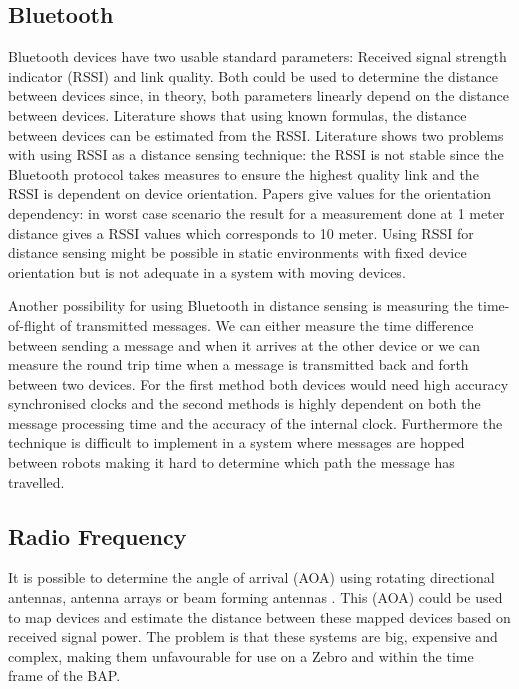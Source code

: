 \subsection*{Bluetooth}

Bluetooth devices have two usable standard parameters: Received signal strength indicator (RSSI) and link quality. Both could be used to determine the distance between devices since, in theory, both parameters linearly depend on the distance between devices. Literature shows that using known formulas, the distance between devices can be estimated from the RSSI. Literature \cite{Forno2005} shows two problems with using RSSI as a distance sensing technique: the RSSI is not stable since the Bluetooth protocol takes measures to ensure the highest quality link and the RSSI is dependent on device orientation. Papers \cite{Scheerens2012,Dahlgren2014} give values for the orientation dependency: in worst case scenario the result for a measurement done at 1 meter distance gives a RSSI values which corresponds to 10 meter. Using RSSI for distance sensing might be possible in static environments with fixed device orientation but is not adequate in a system with moving devices.

Another possibility for using Bluetooth in distance sensing is measuring the time-of-flight of transmitted messages. We can either measure the time difference between sending a message and when it arrives at the other device or we can measure the round trip time when a message is transmitted back and forth between two devices. For the first method both devices would need high accuracy synchronised clocks \cite{Ekberg2009} and the second methods is highly dependent on both the message processing time and the accuracy of the internal clock. Furthermore the technique is difficult to implement in a system where messages are hopped between robots making it hard to determine which path the message has travelled.

\subsection*{Radio Frequency}

It is possible to determine the angle of arrival (AOA) using rotating directional antennas, antenna arrays or beam forming antennas \cite{Min2016}. This (AOA) could be used to map devices and estimate the distance between these mapped devices based on received signal power. The problem is that these systems are big, expensive and complex, making them unfavourable for use on a Zebro and within the time frame of the BAP.

